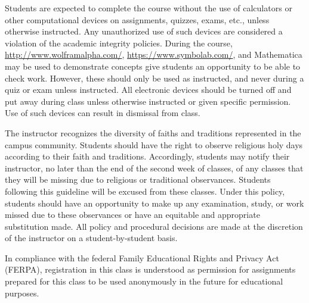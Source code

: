 \documentclass[11pt,letterpaper]{article}
\begin{document}

Students are expected to complete the course without the use of calculators or other computational devices on assignments, quizzes, exams, etc., unless otherwise instructed. Any unauthorized use of such devices are considered a violation of the academic integrity policies. During the course, \href{http://www.wolframalpha.com/}{http://www.wolframalpha.com/}, \href{https://www.symbolab.com/}{https://www.symbolab.com/}, and Mathematica may be used to demonstrate concepts give students an opportunity to be able to check work. However, these should only be used as instructed, and never during a quiz or exam unless instructed. All electronic devices should be turned off and put away during class unless otherwise instructed or given specific permission. Use of such devices can result in dismissal from class.
\sectionbreak




The instructor recognizes the diversity of faiths and traditions represented in the campus community. Students should have the right to observe religious holy days according to their faith and traditions. Accordingly, students may notify their instructor, no later than the end of the second week of classes, of any classes that they will be missing due to religious or traditional observances. Students following this guideline will be excused from these classes. Under this policy, students should have an opportunity to make up any examination, study, or work missed due to these observances or have an equitable and appropriate substitution made. All policy and procedural decisions are made at the discretion of the instructor on a student-by-student basis. 
\sectionbreak




In compliance with the federal Family Educational Rights and Privacy Act (FERPA), registration in this class is understood as permission for assignments prepared for this class to be used anonymously in the future for educational purposes.
\sectionbreak



\end{document}
